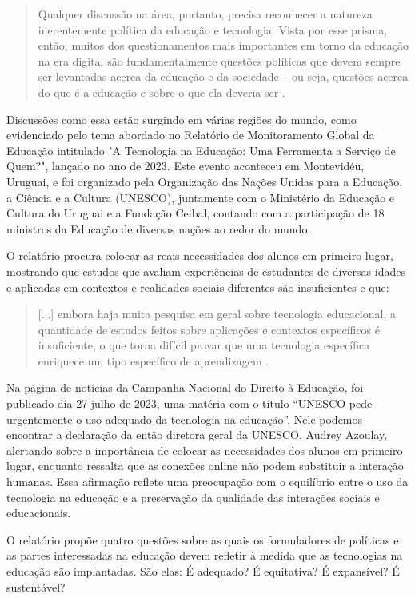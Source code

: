 \documentclass[portuguese]{textolivre}
\begin{document}
\begin{quote}
    Qualquer discussão na área, portanto, precisa reconhecer a natureza inerentemente política da educação e tecnologia. Vista por esse prisma, então, muitos dos questionamentos mais importantes em torno da educação na era digital são fundamentalmente questões políticas que devem sempre ser levantadas acerca da educação e da sociedade – ou seja, questões acerca do que é a educação e sobre o que ela deveria ser \cite[p. 89]{ferreira_educacao_2017}.
\end{quote}

Discussões como essa estão surgindo em várias regiões do mundo, como evidenciado pelo tema abordado no Relatório de Monitoramento Global da Educação intitulado "A Tecnologia na Educação: Uma Ferramenta a Serviço de Quem?", lançado no ano de 2023. Este evento aconteceu em Montevidéu, Uruguai, e foi organizado pela Organização das Nações Unidas para a Educação, a Ciência e a Cultura (UNESCO), juntamente com o Ministério da Educação e Cultura do Uruguai e a Fundação Ceibal, contando com a participação de 18 ministros da Educação de diversas nações ao redor do mundo.

O relatório procura colocar as reais necessidades dos alunos em primeiro lugar, mostrando que estudos que avaliam experiências de estudantes de diversas idades e aplicadas em contextos e realidades sociais diferentes são insuficientes e que:

\begin{quote}
    [...] embora haja muita pesquisa em geral sobre tecnologia educacional, a quantidade de estudos feitos sobre aplicações e contextos específicos é insuficiente, o que torna difícil provar que uma tecnologia específica enriquece um tipo específico de aprendizagem \cite[p. 11-12]{unesco_resumo_2023}.
\end{quote}

Na página de notícias da Campanha Nacional do Direito à Educação, foi publicado dia 27 julho de 2023, uma matéria com o título “UNESCO pede urgentemente o uso adequado da tecnologia na educação”. Nele podemos encontrar a declaração da então diretora geral da UNESCO, Audrey Azoulay, alertando sobre a importância de colocar as necessidades dos alunos em primeiro lugar, enquanto ressalta que as conexões online não podem substituir a interação humanas. Essa afirmação reflete uma preocupação com o equilíbrio entre o uso da tecnologia na educação e a preservação da qualidade das interações sociais e educacionais.

O relatório propõe quatro questões sobre as quais os formuladores de políticas e as partes interessadas na educação devem refletir à medida que as tecnologias na educação são implantadas. São elas: É adequado? É equitativa? É expansível? É sustentável?
\end{document}
